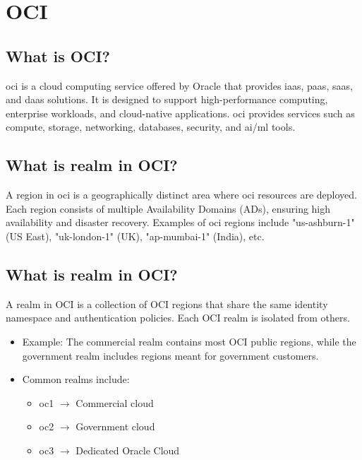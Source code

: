 \documentclass[../main.tex]{subfiles}
\begin{document}
\chapter{OCI}
\section{What is OCI?}
\acrfull{oci} is a cloud computing service offered by Oracle that provides \acrfull{iaas}, \acrfull{paas}, \acrfull{saas}, and \acrfull{daas} solutions.
It is designed to support high-performance computing, enterprise workloads, and cloud-native applications.
\acrshort{oci} provides services such as compute, storage, networking, databases, security, and \acrshort{ai}/\acrshort{ml} tools.

\section{What is realm in OCI?}
A region in \acrshort{oci} is a geographically distinct area where \acrshort{oci} resources are deployed.
Each region consists of multiple Availability Domains (ADs), ensuring high availability and disaster recovery.
Examples of \acrshort{oci} regions include "us-ashburn-1" (US East), "uk-london-1" (UK), "ap-mumbai-1" (India), etc.
\section{What is realm in OCI?}
A realm in OCI is a collection of OCI regions that share the same identity namespace and authentication policies.
Each OCI realm is isolated from others.
\begin{itemize}
  \item {Example: The commercial realm contains most OCI public regions, while the government realm includes regions meant for government customers.}
  \item {Common realms include:
      \begin{itemize}
        \item oc1 $\rightarrow$ Commercial cloud
        \item oc2 $\rightarrow$ Government cloud
        \item oc3 $\rightarrow$ Dedicated Oracle Cloud
      \end{itemize}
    }
\end{itemize}

\end{document}
